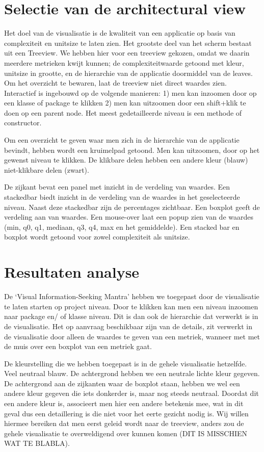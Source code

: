 \documentclass[a4paper]{article}
\begin{document}
\section{Selectie van de architectural view}
Het doel van de visualisatie is de kwaliteit van een applicatie op basis van complexiteit en unitsize te laten zien. Het grootste deel van het scherm bestaat uit een Treeview. We hebben hier voor een treeview gekozen, omdat we daarin meerdere metrieken kwijt kunnen; de complexiteitwaarde getoond met kleur,  unitsize in grootte, en de hierarchie van de applicatie doormiddel van de leaves. Om het overzicht te bewaren, laat de treeview niet direct waardes zien. Interactief is ingebouwd op de volgende manieren: 1) men kan inzoomen door op een klasse of package te klikken 2) men kan uitzoomen door een shift+klik te doen op een parent node. Het meest gedetailleerde niveau is een methode of constructor.

Om een overzicht te geven waar men zich in de hierarchie van de applicatie bevindt, hebben wordt een kruimelpad getoond. Men kan uitzoomen, door op het gewenst niveau te klikken. De klikbare delen hebben een andere kleur (blauw) niet-klikbare delen (zwart).

De zijkant bevat een panel met inzicht in de verdeling van waardes. Een stackedbar biedt inzicht in de verdeling van de waardes in het geselecteerde niveau. Naast deze stackedbar zijn de percentages zichtbaar. Een boxplot geeft de verdeling aan van waardes. Een mouse-over laat een popup zien van de waardes (min, q0, q1, mediaan, q3, q4, max en het gemiddelde).
Een stacked bar en boxplot wordt getoond voor zowel complexiteit als unitsize.


\section{Resultaten analyse}
De `Visual Information-Seeking Mantra' hebben we toegepast door de visualisatie te laten starten op project niveau. Door te klikken kan men een niveau inzoomen naar package en/ of klasse niveau. Dit is dan ook de hierarchie dat verwerkt is in de visualisatie. Het op aanvraag beschikbaar zijn van de details, zit verwerkt in de visualisatie door alleen de waardes te geven van een metriek, wanneer met met de muis over een boxplot van een metriek gaat.

De kleurstelling die we hebben toegepast is in de gehele visualisatie hetzelfde. Veel neutraal blauw. De achtergrond hebben we een neutrale lichte kleur gegeven. De achtergrond aan de zijkanten waar de boxplot staan, hebben we wel een andere kleur gegeven die iets donkerder is, maar nog steeds neutraal. Doordat dit een andere kleur is, associeert men hier een andere betekenis mee, wat in dit geval dus een detaillering is die niet voor het eerte gezicht nodig is. Wij willen hiermee bereiken dat men eerst geleid wordt naar de treeview, anders zou de gehele visualisatie te overweldigend over kunnen komen (DIT IS MISSCHIEN WAT TE BLABLA).




\end{document}

